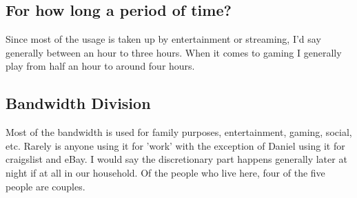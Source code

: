 \documentclass[12pt,letterpaper]{article}
\begin{document}
\subsection{For how long a period of time?}
Since most of the usage is taken up by entertainment or streaming, I'd
say generally between an hour to three hours. When it comes to gaming I
generally play from half an hour to around four hours.

\subsection{Bandwidth Division}
Most of the bandwidth is used for family purposes, entertainment,
gaming, social, etc. Rarely is anyone using it for 'work' with the
exception of Daniel using it for craigslist and eBay. I would say the
discretionary part happens generally later at night if at all in our
household. Of the people who live here, four of the five people are
couples.
\end{document}
